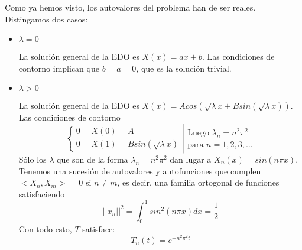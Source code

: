 Como ya hemos visto, los autovalores del problema han de ser reales. Distingamos dos casos:
\begin{itemize}
\item $\lambda = 0$

La solución general de la EDO es $X(x) = ax+b$. Las condiciones de contorno implican que $b=a=0$, que es la solución trivial.

\item $\lambda > 0$

La solución general de la EDO es $X(x) = Acos(\sqrt{\lambda}x + Bsin(\sqrt{\lambda}x))$. Las condiciones de contorno
\begin{equation*}
\left\{
\begin{array}{l}
0=X(0) = A\\
0=X(1) = Bsin(\sqrt{\lambda}x)
\end{array}
\right|
\begin{array}{l}
\text{Luego }\lambda_n = n^2\pi^2\\
\text{para }n=1,2,3,\hdots
\end{array}
\end{equation*}
Sólo los $\lambda$ que son de la forma $\lambda_n = n^2\pi^2$ dan lugar a $X_n(x)=sin(n\pi x)$.
Tenemos una sucesión de autovalores y autofunciones que cumplen $<X_n, X_m> = 0$ si $n\neq m$, es decir, una familia ortogonal de funciones satisfaciendo
$$||x_n||^2=\int_0^1sin^2(n\pi x)dx = \frac{1}{2}$$
Con todo esto, $T$ satisface:
$$T_n(t) = e^{-n^2\pi^2t}$$
\end{itemize}

